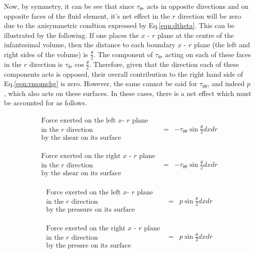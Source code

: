 	Now, by symmetry, it can be see that since $\tau_{\theta r}$ acts in opposite directions and on opposite
faces of the fluid element, it's net effect in the $r$ direction will be zero due to the axisymmetric condtion
expressed by Eq.\ref{eqn:dtheta}.  This can be illustrated by the following.  If one places the $x$ - $r$ plane
at the centre of the infantesimal volume, then the distance to each boundary $x$ - $r$ plane (the left and right sides
of the volume) is $\frac{\theta}{2}$.  The component of $\tau_{\theta r}$ acting on each of these faces in the $r$ 
direction is $\tau_{\theta r}\cos{\frac{\theta}{2}}$.  Therefore, given that the direction each of these components 
acts is opposed, their overall contribution to the right hand side of Eq.\ref{eqn:rmomchg} is zero.  However, the same 
cannot be said for $\tau_{\theta \theta}$, and indeed $p$, which also 
acts on these surfaces.  In these cases, there is a net effect which must be accounted for as follows.

\begin{displaymath}
	\begin{array}{ccc}
		\begin{array}{c}
		\textrm{Force exerted on the left $x$- $r$ plane} \\
		\textrm{in the $r$ direction} \\
		\textrm{by the shear on its surface}
		\end{array} & = &
		- \tau_{\theta \theta}\sin{\frac{\theta}{2}}dxdr \\
   	& \\ & \\
		\begin{array}{c}
		\textrm{Force exerted on the right $x$ - $r$ plane}\\
		\textrm{in the $r$ direction} \\
		\textrm{by the shear on its surface}
		\end{array} & = &
		- \tau_{\theta \theta}\sin{\frac{\theta}{2}}dxdr
	\end{array}
\end{displaymath}  

\begin{displaymath}
	\begin{array}{ccc}
		\begin{array}{c}
		\textrm{Force exerted on the left $x$- $r$ plane} \\
		\textrm{in the $r$ direction} \\
		\textrm{by the pressure on its surface}
		\end{array} & = &
		p \sin{\frac{\theta}{2}}dxdr \\
   	& \\ & \\
		\begin{array}{c}
		\textrm{Force exerted on the right $x$ - $r$ plane}\\
		\textrm{in the $r$ direction} \\
		\textrm{by the pressre on its surface}
		\end{array} & = &
		p \sin{\frac{\theta}{2}}dxdr
	\end{array}
\end{displaymath}  

